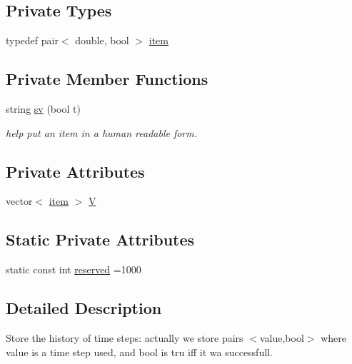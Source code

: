\subsection*{Private Types}
\begin{DoxyCompactItemize}
\item 
typedef pair$<$ double, bool $>$ \hyperlink{classodes_1_1history_acdef162116d3a9e984e4b9bc2ae0d3c5}{item}
\end{DoxyCompactItemize}
\subsection*{Private Member Functions}
\begin{DoxyCompactItemize}
\item 
string \hyperlink{classodes_1_1history_a90ca7d0dbf85b6fa544eb2f078d97fc4}{sv} (bool t)
\begin{DoxyCompactList}\small\item\em help put an item in a human readable form. \end{DoxyCompactList}\end{DoxyCompactItemize}
\subsection*{Private Attributes}
\begin{DoxyCompactItemize}
\item 
vector$<$ \hyperlink{classodes_1_1history_acdef162116d3a9e984e4b9bc2ae0d3c5}{item} $>$ \hyperlink{classodes_1_1history_a0e01bf6ce07b34ac17ff7effcb6661e6}{V}
\end{DoxyCompactItemize}
\subsection*{Static Private Attributes}
\begin{DoxyCompactItemize}
\item 
static const int \hyperlink{classodes_1_1history_aae7ab8f6f1fe6235c450a493b4f164f5}{reserved} =1000
\end{DoxyCompactItemize}


\subsection{Detailed Description}
Store the history of time steps\-: actually we store pairs $<$value,bool$>$ where value is a time step used, and bool is tru iff it wa successfull. 


